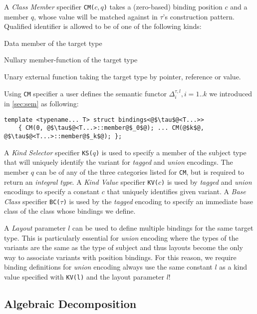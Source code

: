 \documentclass{llncs}
\makeatletter
\DeclareRobustCommand{\code}[1]{{\lstinline[keepspaces,breaklines=false,escapechar=@]{#1}}}
\makeatother
\begin{document}
A \emph{Class Member} specifier \code{CM(}$c,q$\code{)} takes a (zero-based) binding 
position $c$ and a member $q$, whose value will be matched against in $\tau$'s 
construction pattern. Qualified identifier is allowed to be of one of the 
following kinds:

\begin{compactitem}
\setlength{\itemsep}{0pt}
\setlength{\parskip}{0pt}
\item Data member of the target type
\item Nullary member-function of the target type
\item Unary external function taking the target type by pointer, reference or value.
\end{compactitem}

\noindent
Using \code{CM} specifier a user defines the semantic functor 
$\Delta_i^{\tau,l},i=1..k$ we introduced in \textsection\ref{sec:sem} as 
following:

\begin{lstlisting}[keepspaces]
template <typename... T> struct bindings<@$\tau$@<T...>> 
    { CM(0, @$\tau$@<T...>::member@$_0$@); ... CM(@$k$@, @$\tau$@<T...>::member@$_k$@); };
\end{lstlisting}

\noindent
A \emph{Kind Selector} specifier \code{KS(}$q$\code{)} is used to specify a member 
of the subject type that will uniquely identify the variant for \emph{tagged} 
and \emph{union} encodings. The member $q$ can be of any of the three categories 
listed for \code{CM}, but is required to return an \emph{integral type}.
A \emph{Kind Value} specifier \code{KV(}$c$\code{)} is used by \emph{tagged} and 
\emph{union} encodings to specify a constant $c$ that uniquely identifies given 
variant. 
A \emph{Base Class} specifier \code{BC(}$\tau$\code{)} is used by the \emph{tagged}
encoding to specify an immediate base class of the class whose bindings we 
define.

A \emph{Layout} parameter $l$ can be used to define multiple bindings for the same 
target type. This is particularly essential for \emph{union} encoding where the 
types of the variants are the same as the type of subject and thus layouts 
become the only way to associate variants with position bindings. For this 
reason, we require binding definitions for \emph{union} encoding always use the 
same constant $l$ as a kind value specified with \code{KV(l)} and the layout 
parameter $l$!

\subsection{Algebraic Decomposition}
\label{sec:slv}
\end{document}
